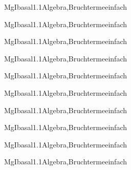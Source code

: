 \documentclass[12pt]{article}
\begin{document}
    \begin{Add}{MgI}{basal1.1}{Algebra,Bruchterme}{einfach}
    \solution{ }
    \end{Add}
    \begin{Add}{MgI}{basal1.1}{Algebra,Bruchterme}{einfach}
    \end{Add}
    

    \begin{Add}{MgI}{basal1.1}{Algebra,Bruchterme}{einfach}
    \solution{ }
    \end{Add}
    \begin{Add}{MgI}{basal1.1}{Algebra,Bruchterme}{einfach}
    \end{Add}
    

    \begin{Add}{MgI}{basal1.1}{Algebra,Bruchterme}{einfach}
    \solution{ }
    \end{Add}
    \begin{Add}{MgI}{basal1.1}{Algebra,Bruchterme}{einfach}
    \end{Add}
    

    \begin{Add}{MgI}{basal1.1}{Algebra,Bruchterme}{einfach}
    \solution{ }
    \end{Add}
    \begin{Add}{MgI}{basal1.1}{Algebra,Bruchterme}{einfach}
    \end{Add}
    

    \begin{Add}{MgI}{basal1.1}{Algebra,Bruchterme}{einfach}
    \solution{ }
    \end{Add}
    \begin{Add}{MgI}{basal1.1}{Algebra,Bruchterme}{einfach}
    \end{Add}
    
\end{document}

